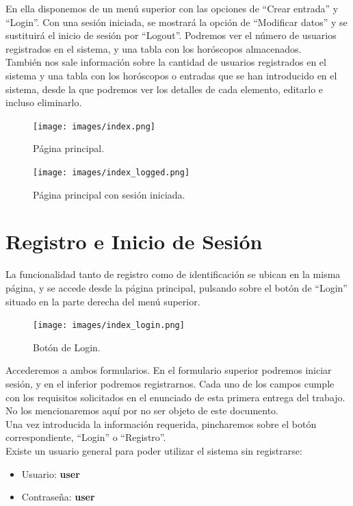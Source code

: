 \documentclass[12pt, twoside]{report}
\begin{document}
\newline
En ella disponemos de un menú superior con las opciones de ``Crear entrada'' y ``Login''. Con una sesión iniciada, se mostrará la opción de ``Modificar datos'' y se sustituirá el inicio de sesión por ``Logout''. Podremos ver el número de usuarios registrados en el sistema, y una tabla con los horóscopos almacenados. \\
También nos sale información sobre la cantidad de usuarios registrados en el sistema y una tabla con los horóscopos o entradas que se han introducido en el sistema, desde la que podremos ver los detalles de cada elemento, editarlo e incluso eliminarlo.\\
\begin{figure}[h]
\begin{center}
\texttt{[image: images/index.png]}
\end{center}
\caption{\label{inicio} Página principal.}
\end{figure}
\begin{figure}[h]
\begin{center}
\texttt{[image: images/index\_logged.png]}
\end{center}
\caption{\label{inicio} Página principal con sesión iniciada.}
\end{figure}
\clearpage

\section{Registro e Inicio de Sesión}
La funcionalidad tanto de registro como de identificación se ubican en la misma página, y se accede desde la página principal, pulsando sobre el botón de ``Login'' situado en la parte derecha del menú superior.
\begin{figure}[h]
\begin{center}
\texttt{[image: images/index\_login.png]}
\end{center}
\caption{\label{inicio} Botón de Login.}
\end{figure}
\newline
Accederemos a ambos formularios. En el formulario superior podremos iniciar sesión, y en el inferior podremos registrarnos.
Cada uno de los campos cumple con los requisitos solicitados en el enunciado de esta primera entrega del trabajo. No los mencionaremos aquí por no ser objeto de este documento.\\
Una vez introducida la información requerida, pincharemos sobre el botón correspondiente, ``Login'' o ``Registro''.\\
Existe un usuario general para poder utilizar el sistema sin registrarse:
\begin{itemize}
    \item Usuario: \textbf{user}
    \item Contraseña: \textbf{user\\}
\end{itemize}
\end{document}

